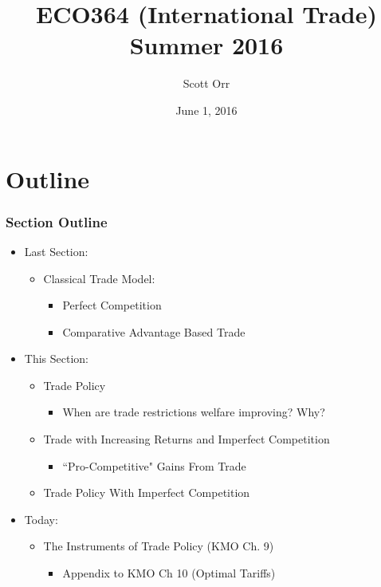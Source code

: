 \documentclass{beamer}
\title{ECO364 (International Trade) Summer 2016}
\date{June 1, 2016}
\author[Scott Orr]{Scott Orr}
\institute{University of Toronto}
\begin{document}
	
	\begin{frame}
		\titlepage
	\end{frame}
	
\section{Outline}
	
\begin{frame}
	\frametitle{Section Outline}
\begin{itemize}
	\item Last Section:
	\begin{itemize}
		\item Classical Trade Model:
		\begin{itemize}
			\item Perfect Competition
			\item Comparative Advantage Based Trade
		\end{itemize}
	\end{itemize}
	\item This Section:
	\begin{itemize}
		\item Trade Policy 
		\begin{itemize}
			\item When are trade restrictions welfare improving? Why?
		\end{itemize}
		\item Trade with Increasing Returns and Imperfect Competition
		\begin{itemize}
			\item``Pro-Competitive" Gains From Trade
		\end{itemize}
		\item Trade Policy With Imperfect Competition
	\end{itemize}
	\item Today:
	\begin{itemize}
		\item The Instruments of Trade Policy (KMO Ch. 9)
			\begin{itemize}
				\item Appendix to KMO Ch 10 (Optimal Tariffs)
			\end{itemize}
	\end{itemize}
\end{itemize}
\end{frame}
\end{document}
